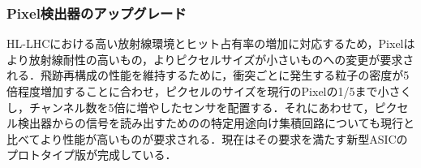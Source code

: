 \subsubsection*{Pixel検出器のアップグレード}
HL-LHCにおける高い放射線環境とヒット占有率の増加に対応するため，Pixelはより放射線耐性の高いもの，よりピクセルサイズが小さいものへの変更が要求される．飛跡再構成の性能を維持するために，衝突ごとに発生する粒子の密度が5倍程度増加することに合わせ，ピクセルのサイズを現行のPixelの1/5まで小さくし，チャンネル数を5倍に増やしたセンサを配置する．それにあわせて，ピクセル検出器からの信号を読み出すためのの特定用途向け集積回路についても現行と比べてより性能が高いものが要求される．現在はその要求を満たす新型ASICのプロトタイプ版が完成している．\par




 

